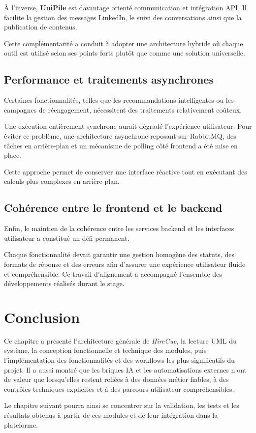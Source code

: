 À l'inverse, \textbf{UniPile} est davantage orienté communication et intégration API. Il facilite la gestion des messages LinkedIn, le suivi des conversations ainsi que la publication de contenus.

Cette complémentarité a conduit à adopter une architecture hybride où chaque outil est utilisé selon ses points forts plutôt que comme une solution universelle.

\subsection{Performance et traitements asynchrones}

Certaines fonctionnalités, telles que les recommandations intelligentes ou les campagnes de réengagement, nécessitent des traitements relativement coûteux.

Une exécution entièrement synchrone aurait dégradé l'expérience utilisateur. Pour éviter ce problème, une architecture asynchrone reposant sur RabbitMQ, des tâches en arrière-plan et un mécanisme de polling côté frontend a été mise en place.

Cette approche permet de conserver une interface réactive tout en exécutant des calculs plus complexes en arrière-plan.

\subsection{Cohérence entre le frontend et le backend}

Enfin, le maintien de la cohérence entre les services backend et les interfaces utilisateur a constitué un défi permanent.

Chaque fonctionnalité devait garantir une gestion homogène des statuts, des formats de réponse et des erreurs afin d'assurer une expérience utilisateur fluide et compréhensible. Ce travail d'alignement a accompagné l'ensemble des développements réalisés durant le stage.

\section{Conclusion}

Ce chapitre a présenté l'architecture générale de \textit{HireCue}, la lecture UML du système, la conception fonctionnelle et technique des modules, puis l'implémentation des fonctionnalités et des workflows les plus significatifs du projet. Il a aussi montré que les briques IA et les automatisations externes n'ont de valeur que lorsqu'elles restent reliées à des données métier fiables, à des contrôles techniques explicites et à des parcours utilisateur compréhensibles.

Le chapitre suivant pourra ainsi se concentrer sur la validation, les tests et les résultats obtenus à partir de ces modules et de leur intégration dans la plateforme.
